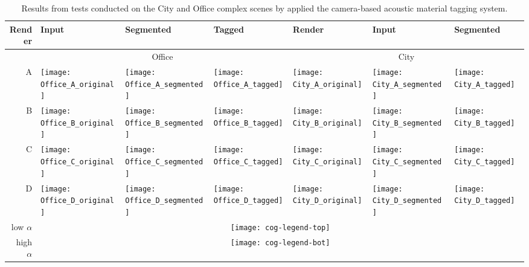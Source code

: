 \begin{landscape}
\begin{table}[]
\def\cogimsw{0.17\textwidth}
\centering
\caption[Camera-based material tagging --- preliminary results]{Results from tests conducted on the City and Office complex scenes by applied the camera-based acoustic material tagging system.}
\begin{tabular}{rllllll}
\toprule
Render & Input & Segmented & Tagged & Render & Input & Segmented \\ \midrule
\multicolumn{1}{r}{}  & \multicolumn{3}{c}{Office} & \multicolumn{3}{c}{City} \\
\multicolumn{1}{r}{A} & \texttt{[image: Office\_A\_original]} & \texttt{[image: Office\_A\_segmented]} & \texttt{[image: Office\_A\_tagged]} & \texttt{[image: City\_A\_original]} & \texttt{[image: City\_A\_segmented]} & \texttt{[image: City\_A\_tagged]} \\
\multicolumn{1}{r}{B} & \texttt{[image: Office\_B\_original]} & \texttt{[image: Office\_B\_segmented]} & \texttt{[image: Office\_B\_tagged]} & \texttt{[image: City\_B\_original]} & \texttt{[image: City\_B\_segmented]} & \texttt{[image: City\_B\_tagged]} \\
\multicolumn{1}{r}{C} & \texttt{[image: Office\_C\_original]} & \texttt{[image: Office\_C\_segmented]} & \texttt{[image: Office\_C\_tagged]} & \texttt{[image: City\_C\_original]} & \texttt{[image: City\_C\_segmented]} & \texttt{[image: City\_C\_tagged]} \\
\multicolumn{1}{r}{D} & \texttt{[image: Office\_D\_original]} & \texttt{[image: Office\_D\_segmented]} & \texttt{[image: Office\_D\_tagged]} & \texttt{[image: City\_D\_original]} & \texttt{[image: City\_D\_segmented]} & \texttt{[image: City\_D\_tagged]} \\
\multicolumn{1}{r}{low $\alpha$} & \multicolumn{6}{c}{\texttt{[image: cog-legend-top]}} \\
\multicolumn{1}{r}{high $\alpha$} & \multicolumn{6}{c}{\texttt{[image: cog-legend-bot]}} 
\end{tabular}
\label{tab:cog-preliminary-results}
\end{table}
\end{landscape}